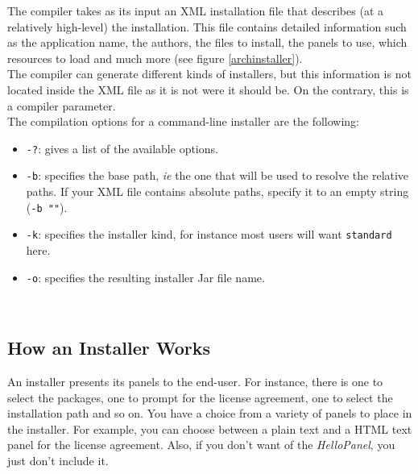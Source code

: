 The compiler takes as its input an XML installation file that describes
(at a relatively high-level) the installation. This file contains
detailed information such as the application name, the authors, the
files to install, the panels to use, which resources to load and much
more (see figure \ref{archinstaller}).\\

The compiler can generate different kinds of installers, but this information is
not located inside the XML file as it is not were it should be. On the contrary,
this is a compiler parameter.\\

The compilation options for a command-line installer are the following:
\begin{itemize}
\item \texttt{-?}: gives a list of the available options.
\item \texttt{-b}: specifies the base path, \textsl{ie} the one that will be
used to resolve the relative paths. If your XML file contains absolute paths,
specify it to an empty string (\texttt{-b ""}).
\item \texttt{-k}: specifies the installer kind, for instance most users will
want \texttt{standard} here.
\item \texttt{-o}: specifies the resulting installer Jar file name.
\end{itemize}\

\subsection{How an Installer Works}

An installer presents its panels to the end-user. For instance, there is
one to select the packages, one to prompt for the license agreement, one
to select the installation path and so on. You have a choice from a
variety of panels to place in the installer. For example, you can choose
between a plain text and a HTML text panel for the license agreement.
Also, if you don't want of the \textit{HelloPanel}, you just don't
include it.\\ 


